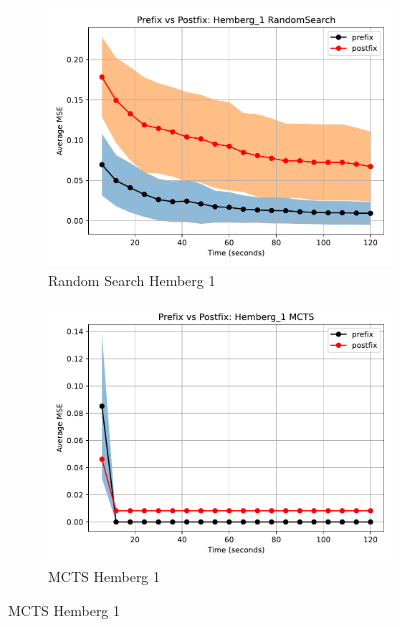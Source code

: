 \documentclass[12pt]{iopart}
\begin{document}
\begin{figure}
    \centering
    
    \begin{subfigure}[b]{0.4\textwidth}
        \includegraphics[width=\linewidth, keepaspectratio]{Hemberg_Benchmarks/PrePostHemberg_1RandomSearch.pdf}
        \caption{Random Search Hemberg 1}
        \label{subfig:hemberg_1_RS}
    \end{subfigure}
    \begin{subfigure}[b]{0.4\textwidth}
        \includegraphics[width=\linewidth, keepaspectratio]{Hemberg_Benchmarks/PrePostHemberg_1MCTS.pdf}
        \caption{MCTS Hemberg 1}
        \label{subfig:hemberg_1_MCTS}
    \end{subfigure}
    

\end{figure}
\end{document}
